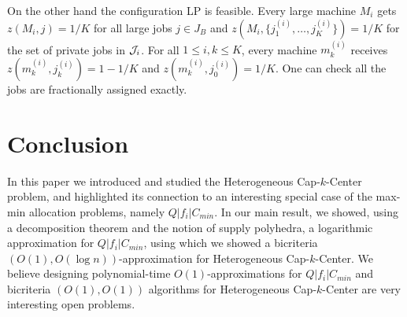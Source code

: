 \documentclass{article}[11pt]
\def\mckc{{\sffamily Heterogeneous Cap-$k$-Center}\xspace}
\def\cckp{$Q|f_i|C_{min}$\xspace}
\begin{document}
On the other hand the configuration LP is feasible. Every large machine $M_i$ gets $z(M_i, j) = 1/K$ for all large jobs $j\in J_B$ and $z(M_i,\{j^{(i)}_1,\ldots, j^{(i)}_K\}) = 1/K$ for the set of private jobs in ${\cal J}_i$.
For all $1\leq i,k\leq K$, every machine $m^{(i)}_k$ receives $z(m^{(i)}_k,j^{(i)}_k) = 1-1/K$ and $z(m^{(i)}_k,j^{(i)}_0) = 1/K$. One can check all the jobs are fractionally assigned exactly.

\section{Conclusion}
In this paper we introduced and studied the \mckc problem, and highlighted its connection to an interesting special case of the max-min allocation problems, namely \cckp. In our main result, we showed, using a decomposition theorem and the notion of supply polyhedra, a logarithmic approximation for \cckp, using which we showed a bicriteria $(O(1),O(\log n))$-approximation for \mckc. We believe designing polynomial-time $O(1)$-approximations for \cckp and bicriteria $(O(1),O(1))$ algorithms for \mckc are very interesting open problems.



\end{document}

